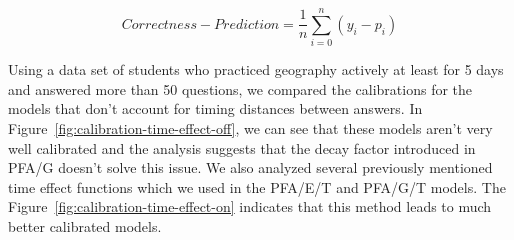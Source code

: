 \begin{equation} \label{eq-callibration}
  \mathit{Correctness} - \mathit{Prediction} = \frac{1}{n} \sum_{i=0}^{n} (y_i - p_i)
\end{equation}

Using a data set of students who practiced geography actively at least for 5 days and answered more than 50 questions, we compared the calibrations for the models that don't account for timing distances between answers. In Figure~\ref{fig:calibration-time-effect-off}, we can see that these models aren't very well calibrated and the analysis suggests that the decay factor introduced in PFA/G doesn't solve this issue. We also analyzed several previously mentioned time effect functions which we used in the PFA/E/T and PFA/G/T models. The Figure~\ref{fig:calibration-time-effect-on} indicates that this method leads to much better calibrated models.


